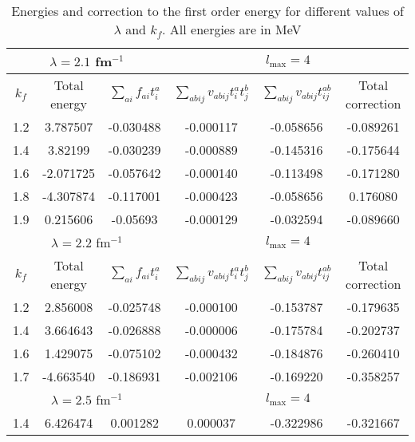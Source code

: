 \begin{table}
		\centering
		\begin{tabular}{|c|c|c|c|c|c|}
				\hline
				\multicolumn{3}{|c|}{$\lambda=2.1$ fm$^{-1}$}& \multicolumn{3}{c|}{$l_{\mbox{max}}=4$ }\\
				\hline
				$k_f$ & Total energy & $\sum_{ai}f_{ai}t^a_i$ & $\sum_{abij}v_{abij}t^a_it^b_j$ & $\sum_{abij}v_{abij}t^{ab}_{ij}$ & Total correction\\
				\hline
				1.2 & 3.787507 & -0.030488 & -0.000117 & -0.058656 & -0.089261  \\
				\hline
				1.4 & 3.82199 &  -0.030239 & -0.000889 & -0.145316 & -0.175644\\
				\hline
				1.6 & -2.071725 & -0.057642 & -0.000140 & -0.113498 & -0.171280 \\
				\hline
				1.8 & -4.307874 & -0.117001 & -0.000423 & -0.058656 & 0.176080 \\
				\hline
				1.9 & 0.215606 & -0.05693 & -0.000129 & -0.032594 & -0.089660 \\
				\hline
				\multicolumn{3}{|c|}{$\lambda=2.2$ fm$^{-1}$}& \multicolumn{3}{c|}{$l_{\mbox{max}}=4$ }\\
				\hline
				$k_f$ & Total energy & $\sum_{ai}f_{ai}t^a_i$ & $\sum_{abij}v_{abij}t^a_it^b_j$ & $\sum_{abij}v_{abij}t^{ab}_{ij}$ & Total correction\\
				\hline
				1.2 & 2.856008 & -0.025748 & -0.000100 & -0.153787 & -0.179635\\
				\hline
				1.4 & 3.664643 & -0.026888 & -0.000006 & -0.175784 & -0.202737\\
			    \hline
				1.6 & 1.429075 & -0.075102 & -0.000432 & -0.184876 & -0.260410\\
				\hline
				1.7 &-4.663540 & -0.186931 & -0.002106 & -0.169220 & -0.358257\\
				\hline
				\multicolumn{3}{|c|}{$\lambda=2.5$ fm$^{-1}$}& \multicolumn{3}{c|}{$l_{\mbox{max}}=4$ }\\
				\hline
				1.4 & 6.426474 & 0.001282 & 0.000037 & -0.322986 & -0.321667\\
				\hline
		\end{tabular}
		\caption{Energies and correction to the first order energy for different values of $\lambda$ and $k_f$. All energies are in MeV}
		\label{tab:korreksjoner}
\end{table}
